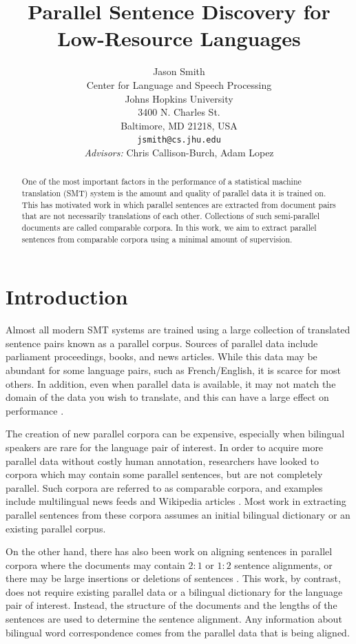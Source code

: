 \documentclass[11pt,letterpaper]{article}
\title{Parallel Sentence Discovery for Low-Resource Languages}
\author{Jason Smith\\
  Center for Language and Speech Processing\\
  Johns Hopkins University\\
  3400 N. Charles St.\\
  Baltimore, MD 21218, USA\\
  {\tt jsmith@cs.jhu.edu}\\
  {\em Advisors:} Chris Callison-Burch, Adam Lopez
}
\begin{document}
\maketitle
\begin{abstract}
One of the most important factors in the performance of a statistical machine
translation (SMT) system is the amount and quality of parallel data it is
trained on. This has motivated work in which parallel sentences are extracted
from document pairs that are not necessarily translations of each other.
Collections of such semi-parallel documents are called comparable corpora. In
this work, we aim to extract parallel sentences from comparable corpora using a
minimal amount of supervision.
\end{abstract}

\section{Introduction}
Almost all modern SMT systems are trained using a large collection of translated
sentence pairs known as a parallel corpus. Sources of parallel data include
parliament proceedings, books, and news articles.
While this data may be abundant for some language pairs, such as
French/English, it is scarce for most others. In addition, even when parallel
data is available, it may not match the domain of the data you wish to
translate, and this can have a large effect on performance \cite{Munteanu05}.

The creation of new parallel corpora can be expensive, especially when bilingual
speakers are rare for the language pair of interest.
In order to acquire more parallel data without costly human annotation,
researchers have looked to corpora which may contain some parallel sentences,
but are not completely parallel. Such corpora are referred to as comparable
corpora, and examples include multilingual news feeds \cite{Munteanu05} and
Wikipedia articles \cite{Adafre06,Smith10}. 
Most work in extracting parallel sentences from
these corpora assumes an initial bilingual dictionary or an existing parallel
corpus.

On the other hand, there has also been work on aligning sentences in parallel
corpora where the documents may contain $2:1$ or $1:2$ sentence alignments, or
there may be large insertions or deletions of sentences \cite{Gale93,Chen93,Moore02}.
This work, by contrast, does not require existing parallel data or a
bilingual dictionary for the language pair of interest. Instead, the structure
of the documents and the lengths of the sentences are used to determine the
sentence alignment. Any information about bilingual word correspondence comes
from the parallel data that is being aligned.
\end{document}
